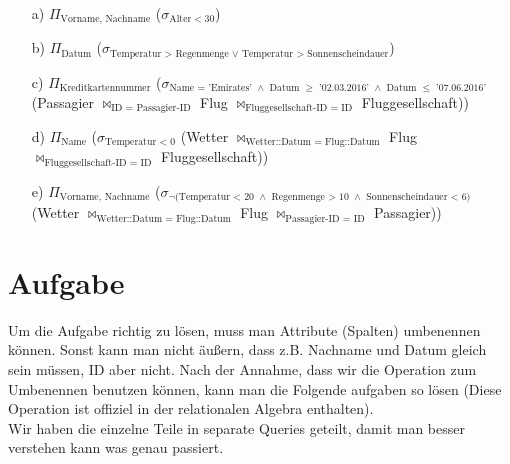 \begin{itemize}


\item[a)]
$\Pi_{\text{Vorname, Nachname}}$ ($\sigma_{\text{Alter} < 30 }$)

\item[b)]
$\Pi_{\text{Datum}}$ ($\sigma_{\text{Temperatur > Regenmenge } \lor \text{ Temperatur > Sonnenscheindauer} }$)

\item[c)]
$\Pi_{\text{Kreditkartennummer}}$ ($\sigma_{\text{Name = 'Emirates' $\land$ Datum $\geq$ '02.03.2016' $\land$ Datum $\leq$ '07.06.2016'}}$  (Passagier $\bowtie_{\text{ID = Passagier-ID}}$ Flug $\bowtie_{\text{Fluggesellschaft-ID = ID}}$ Fluggesellschaft))

\item[d)]
$\Pi_{\text{Name}}$ ($\sigma_{\text{Temperatur < 0}}$ (Wetter $\bowtie_{\text{Wetter::Datum = Flug::Datum}}$ Flug $\bowtie_{\text{Fluggesellschaft-ID = ID}}$ Fluggesellschaft))

\item[e)]
$\Pi_{\text{Vorname, Nachname}}$ ($\sigma_{\neg\text{(Temperatur < 20 $\land$ Regenmenge > 10 $\land$ Sonnenscheindauer < 6)}}$ (Wetter $\bowtie_{\text{Wetter::Datum = Flug::Datum}}$ Flug $\bowtie_{\text{Passagier-ID = ID}}$ Passagier))

\end{itemize}

\section{Aufgabe}

Um die Aufgabe richtig zu lösen, muss man Attribute (Spalten) umbenennen können. Sonst kann man nicht äußern, dass z.B. Nachname und Datum gleich sein müssen, ID aber nicht. 
Nach der Annahme, dass wir die Operation zum Umbenennen benutzen können, kann man die Folgende aufgaben so lösen (Diese Operation ist offiziel in der relationalen Algebra enthalten). \\

Wir haben die einzelne Teile in separate Queries geteilt, damit man besser verstehen kann was genau passiert.

